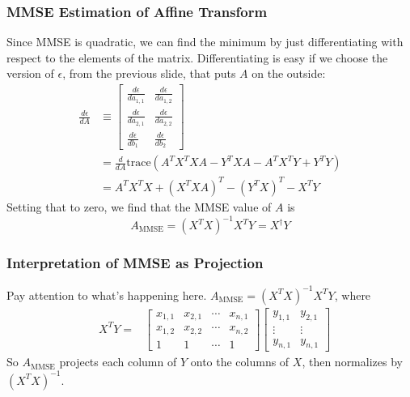 \documentclass{beamer}
\begin{document}
\begin{frame}
  \frametitle{MMSE Estimation of Affine Transform}

  Since MMSE is quadratic, we can find the minimum by just
  differentiating with respect to the elements of the matrix.
  Differentiating is easy if we choose the version of $\epsilon$, from
  the previous slide, that puts $A$ on the outside:
  \begin{align*}
    \frac{d\epsilon}{dA} &\equiv
    \left[\begin{array}{cc}
        \frac{d\epsilon}{da_{1,1}} &\frac{d\epsilon}{da_{1,2}}\\
        \frac{d\epsilon}{da_{2,1}} &\frac{d\epsilon}{da_{2,2}}\\
        \frac{d\epsilon}{db_{1}} &\frac{d\epsilon}{db_{2}}
      \end{array}\right]\\
    &=\frac{d}{dA} \text{trace}\left(A^TX^TXA-Y^TXA-A^TX^TY+Y^TY\right)\\
    &= A^TX^TX + (X^TXA)^T -(Y^TX)^T - X^TY
  \end{align*}
  Setting that to zero, we find that the MMSE value of $A$ is
  \begin{displaymath}
    A_{\text{MMSE}} = (X^TX)^{-1}X^TY = X^\dag Y
  \end{displaymath}
\end{frame}

\begin{frame}
  \frametitle{Interpretation of MMSE as Projection}

  Pay attention to what's happening here. $A_{\text{MMSE}} = (X^TX)^{-1}X^TY$, where
  \begin{align*}
    &X^TY=
    &
    \left[\begin{array}{cccc}
        x_{1,1}&x_{2,1}&\cdots&x_{n,1}\\
        x_{1,2}&x_{2,2}&\cdots&x_{n,2}\\
        1&1&\cdots&1
      \end{array}\right]
    \left[\begin{array}{cc}
        y_{1,1}&y_{2,1}\\
        \vdots&\vdots\\
        y_{n,1}&y_{n,1}
      \end{array}\right]
  \end{align*}
  So $A_{\text{MMSE}}$ projects each column of $Y$ onto the columns of $X$, then
  normalizes by $(X^TX)^{-1}$.
\end{frame}
\end{document}
